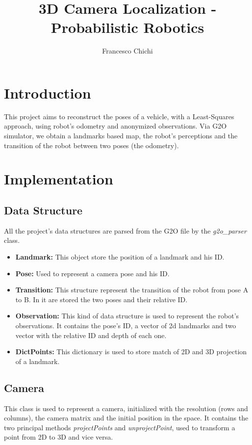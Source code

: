 \documentclass[10pt]{article}
\title{3D Camera Localization - Probabilistic Robotics}
\author{ Francesco Chichi}
\begin{document}
	\maketitle
	\section{Introduction}
		This project aims to reconstruct the poses of a vehicle, with a Least-Squares approach, using robot's odometry and anonymized observations. 
		Via G2O simulator, we obtain a landmarks based map, the robot's perceptions and the transition of the robot between two poses (the odometry).

	\section{Implementation}
		\subsection{Data Structure}
		All the project's data structures are parsed from the G2O file by the \textit{g2o\_parser} class.
		\begin{itemize}
			\item \textbf{Landmark:} This object store the position of a landmark and his ID.
			\item \textbf{Pose:} Used to represent a camera pose and his ID.
			\item \textbf{Transition:} This structure represent the transition of the robot from pose A to B. In it are stored the two poses and their relative ID.
			\item \textbf{Observation:} This kind of data structure is used to represent the robot's observations. 
			It contains the pose's ID, a vector of 2d landmarks and two vector with the relative ID and depth of each one.
			\item \textbf{DictPoints:} This dictionary is used to store match of 2D and 3D projection of a landmark.
		\end{itemize}
	
		\subsection{Camera}
		This class is used to represent a camera, initialized with the resolution (rows and columns), the camera matrix and the initial position in the space.
		It contains the two principal methods \textit{projectPoints} and \textit{unprojectPoint}, used to transform a point from 2D to 3D and vice versa.
		
\end{document}
